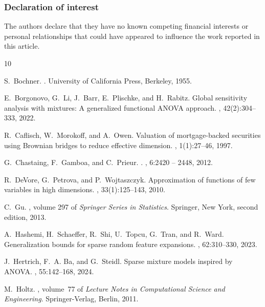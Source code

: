 \documentclass{article}
\theoremstyle{definition}
\numberwithin{equation}{section}
\begin{document}
\subsubsection*{Declaration of interest}
The authors declare that they have no known competing financial interests or personal relationships
that could have appeared to influence the work reported in this article.

\begin{thebibliography}{10}

S.~Bochner.
.
\newblock University of California Press, Berkeley, 1955.

E.~Borgonovo, G.~Li, J.~Barr, E.~Plischke, and H.~Rabitz.
\newblock Global sensitivity analysis with mixtures: A generalized functional
  {ANOVA} approach.
, 42(2):304--333, 2022.

R.~Caflisch, W.~Morokoff, and A.~Owen.
\newblock Valuation of mortgage-backed securities using {B}rownian bridges to
  reduce effective dimension.
, 1(1):27--46, 1997.

G.~Chastaing, F.~Gamboa, and C.~Prieur.
.
, 6:2420 -- 2448, 2012.

R.~DeVore, G.~Petrova, and P.~Wojtaszczyk.
\newblock Approximation of functions of few variables in high dimensions.
, 33(1):125--143, 2010.

C.~Gu.
, volume 297 of {\em Springer
  Series in Statistics}.
\newblock Springer, New York, second edition, 2013.

A.~Hashemi, H.~Schaeffer, R.~Shi, U.~Topcu, G.~Tran, and R.~Ward.
\newblock Generalization bounds for sparse random feature expansions.
, 62:310--330, 2023.

J.~Hertrich, F.~A. Ba, and G.~Steidl.
\newblock Sparse mixture models inspired by {ANOVA}.
, 55:142--168, 2024.

M.~Holtz.
, volume~77 of {\em Lecture Notes in Computational
  Science and Engineering}.
\newblock Springer-Verlag, Berlin, 2011.


\end{thebibliography}
\end{document}
